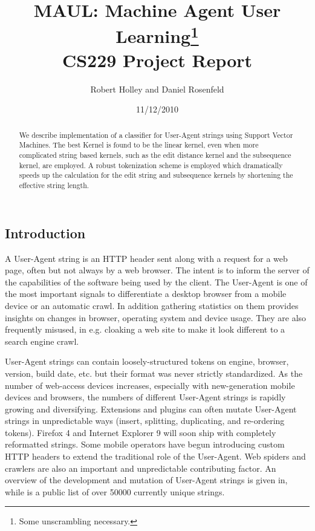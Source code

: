 \documentclass[10pt]{article}
\title{MAUL: Machine Agent User Learning\footnote{Some unscrambling necessary.}\\ CS229 Project Report }
\author{Robert Holley and Daniel Rosenfeld}
\date{11/12/2010}
\begin{document}
\maketitle
\begin{abstract}
We describe implementation of a classifier for User-Agent strings using Support Vector Machines.  The best Kernel is found to be the linear kernel, even when more complicated string based kernels, such as the edit distance kernel and the subsequence kernel, are employed.  A robust tokenization scheme is employed which dramatically speeds up the calculation for the edit string and subsequence kernels by shortening the effective string length. 
\end{abstract}
\begin{multicols}{2}

\section{Introduction}
A User-Agent string is an HTTP header sent along with a request for a web page, often but not always by a web browser.\cite{httprfc} The intent is to inform the server
of the capabilities of the software being used by the client. The User-Agent is
one of the most important signals to differentiate a desktop browser from a
mobile device or an automatic crawl. In addition gathering statistics on them
provides insights on changes in browser, operating system and device usage. They
are also frequently misused, in e.g. cloaking a web site to make it look
different to a search engine crawl.

User-Agent strings can contain loosely-structured tokens on engine, browser,
version, build date, etc. but their format was never strictly standardized.\cite{httprfc}
As the number of web-access devices increases, especially with new-generation
mobile devices and browsers, the numbers of different User-Agent strings is
rapidly growing and diversifying. Extensions and plugins can often mutate
User-Agent strings in unpredictable ways (insert, splitting, duplicating, and
re-ordering tokens). Firefox 4 and Internet Explorer 9 will soon ship with
completely reformatted strings. Some mobile operators have begun introducing
custom HTTP headers to extend the traditional role of the User-Agent.\cite{mobile} Web spiders and crawlers are also an important and unpredictable contributing factor.
An overview of the development and mutation of User-Agent strings is given in,\cite{history} while \cite{uatracker} is a public list of over 50000 currently unique strings.


\end{multicols}
\end{document}
